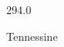 \documentclass[12pt]{article}
\begin{document}
\hfill{}
\vfill
\begin{center}
  {\fontsize{50}{60}
  }

  \vspace{1em}

  294.0

Tennessine
\end{center}
\vfill
\end{document}
